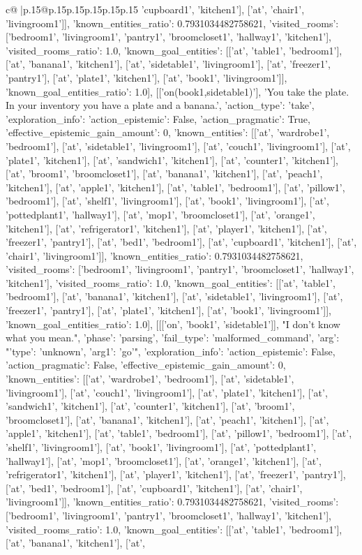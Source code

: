 \documentclass{article}
\begin{document}
{\begin{supertabular}{c@{$\;$}|p{.15\linewidth}@{}p{.15\linewidth}p{.15\linewidth}p{.15\linewidth}p{.15\linewidth}p{.15\linewidth}}
{{{'cupboard1', 'kitchen1'], ['at', 'chair1', 'livingroom1']], 'known_entities_ratio': 0.7931034482758621, 'visited_rooms': ['bedroom1', 'livingroom1', 'pantry1', 'broomcloset1', 'hallway1', 'kitchen1'], 'visited_rooms_ratio': 1.0, 'known_goal_entities': [['at', 'table1', 'bedroom1'], ['at', 'banana1', 'kitchen1'], ['at', 'sidetable1', 'livingroom1'], ['at', 'freezer1', 'pantry1'], ['at', 'plate1', 'kitchen1'], ['at', 'book1', 'livingroom1']], 'known_goal_entities_ratio': 1.0}}], [['on(book1,sidetable1)'], 'You take the plate. In your inventory you have a plate and a banana.', {'action_type': 'take', 'exploration_info': {'action_epistemic': False, 'action_pragmatic': True, 'effective_epistemic_gain_amount': 0, 'known_entities': [['at', 'wardrobe1', 'bedroom1'], ['at', 'sidetable1', 'livingroom1'], ['at', 'couch1', 'livingroom1'], ['at', 'plate1', 'kitchen1'], ['at', 'sandwich1', 'kitchen1'], ['at', 'counter1', 'kitchen1'], ['at', 'broom1', 'broomcloset1'], ['at', 'banana1', 'kitchen1'], ['at', 'peach1', 'kitchen1'], ['at', 'apple1', 'kitchen1'], ['at', 'table1', 'bedroom1'], ['at', 'pillow1', 'bedroom1'], ['at', 'shelf1', 'livingroom1'], ['at', 'book1', 'livingroom1'], ['at', 'pottedplant1', 'hallway1'], ['at', 'mop1', 'broomcloset1'], ['at', 'orange1', 'kitchen1'], ['at', 'refrigerator1', 'kitchen1'], ['at', 'player1', 'kitchen1'], ['at', 'freezer1', 'pantry1'], ['at', 'bed1', 'bedroom1'], ['at', 'cupboard1', 'kitchen1'], ['at', 'chair1', 'livingroom1']], 'known_entities_ratio': 0.7931034482758621, 'visited_rooms': ['bedroom1', 'livingroom1', 'pantry1', 'broomcloset1', 'hallway1', 'kitchen1'], 'visited_rooms_ratio': 1.0, 'known_goal_entities': [['at', 'table1', 'bedroom1'], ['at', 'banana1', 'kitchen1'], ['at', 'sidetable1', 'livingroom1'], ['at', 'freezer1', 'pantry1'], ['at', 'plate1', 'kitchen1'], ['at', 'book1', 'livingroom1']], 'known_goal_entities_ratio': 1.0}}], [[['on', 'book1', 'sidetable1']], "I don't know what you mean.", {'phase': 'parsing', 'fail_type': 'malformed_command', 'arg': "{'type': 'unknown', 'arg1': 'go'}", 'exploration_info': {'action_epistemic': False, 'action_pragmatic': False, 'effective_epistemic_gain_amount': 0, 'known_entities': [['at', 'wardrobe1', 'bedroom1'], ['at', 'sidetable1', 'livingroom1'], ['at', 'couch1', 'livingroom1'], ['at', 'plate1', 'kitchen1'], ['at', 'sandwich1', 'kitchen1'], ['at', 'counter1', 'kitchen1'], ['at', 'broom1', 'broomcloset1'], ['at', 'banana1', 'kitchen1'], ['at', 'peach1', 'kitchen1'], ['at', 'apple1', 'kitchen1'], ['at', 'table1', 'bedroom1'], ['at', 'pillow1', 'bedroom1'], ['at', 'shelf1', 'livingroom1'], ['at', 'book1', 'livingroom1'], ['at', 'pottedplant1', 'hallway1'], ['at', 'mop1', 'broomcloset1'], ['at', 'orange1', 'kitchen1'], ['at', 'refrigerator1', 'kitchen1'], ['at', 'player1', 'kitchen1'], ['at', 'freezer1', 'pantry1'], ['at', 'bed1', 'bedroom1'], ['at', 'cupboard1', 'kitchen1'], ['at', 'chair1', 'livingroom1']], 'known_entities_ratio': 0.7931034482758621, 'visited_rooms': ['bedroom1', 'livingroom1', 'pantry1', 'broomcloset1', 'hallway1', 'kitchen1'], 'visited_rooms_ratio': 1.0, 'known_goal_entities': [['at', 'table1', 'bedroom1'], ['at', 'banana1', 'kitchen1'], ['at', }}}
\end{supertabular}}
\end{document}
